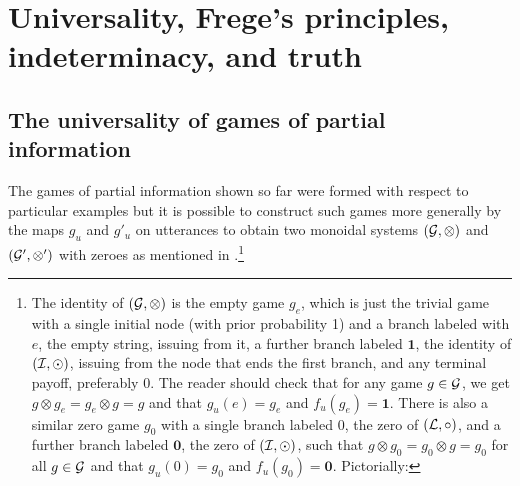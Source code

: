 \chapter{Universality, Frege's principles, indeterminacy, and truth}
\section{The universality of games of partial information}\label{sec:universality}

The games of partial information shown so far were formed with respect to particular examples but it is possible to construct such games more generally by the maps $g_u$ and $g'_u$ on utterances to obtain two monoidal systems $({\cal G}, \otimes)$ and $({\cal G}', \otimes')$ with zeroes as mentioned in .\footnote{The identity of $({\cal G}, \otimes)$ is the empty game $g_e$, which is just the trivial game with a single initial node (with prior probability 1) and a branch labeled with $e$, the empty string, issuing from it, a further branch labeled $\mathbf{1}$, the identity of $({\cal I}, \odot)$, issuing from the node that ends the first branch, and any terminal payoff, preferably $0$. The reader should check that for any game $g \in {\cal G}$, we get $g \otimes g_e = g_e \otimes g = g$ and that $g_u(e) = g_e$ and $f_u(g_e) = \mathbf{1}$. There is also a similar zero game $g_0$ with a single branch labeled $0$, the zero of $({\cal L}, \circ)$, and a further branch labeled $\mathbf{0}$, the zero of $({\cal I}, \odot)$, such that $g \otimes g_0 = g_0 \otimes g = g_0$ for all $g \in {\cal G}$ and that $g_u(0) = g_0$ and $f_u(g_0) = \mathbf{0}$. Pictorially:


}
